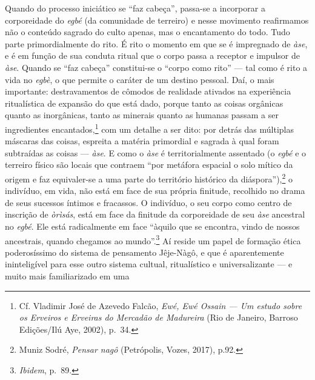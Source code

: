 Quando do processo iniciático se ``faz cabeça'', passa-se a incorporar a
corporeidade do \textit{egbé} (da comunidade de terreiro) e nesse
movimento reafirmamos não o conteúdo sagrado do culto apenas, mas o
encantamento do todo. Tudo parte primordialmente do rito. É rito o
momento em que se é impregnado de \textit{àse}, e é em função de sua
conduta ritual que o corpo passa a receptor e impulsor de \textit{àse}.
Quando se ``faz cabeça'' constitui-se o ``corpo como rito'' --- tal como
é rito a vida no \textit{egbè}, o que permite o caráter de um destino
pessoal. Daí, o mais importante: destravamentos de cômodos de realidade
ativados na experiência ritualística de expansão do que está dado,
porque tanto as coisas orgânicas quanto as inorgânicas, tanto as
minerais quanto as humanas passam a ser ingredientes
encantados,\footnote{Cf. Vladimir José de Azevedo Falcão, \textit{Ewé, Ewé
  Ossain --- Um estudo sobre os Erveiros e Erveiras do Mercadão de
  Madureira} (Rio de Janeiro, Barroso Edições/Ilú Aye, 2002), p.~34.}
com um detalhe a ser dito: por detrás das múltiplas máscaras das coisas,
espreita a matéria primordial e sagrada à qual foram subtraídas as
coisas --- \textit{àse}. E como o \textit{àse} é territorialmente assentado
(o \textit{egbé} e o terreiro físico são locais que contraem ``por
metáfora espacial o solo mítico da origem e faz equivaler-se a uma parte
do território histórico da diáspora''),\footnote{Muniz Sodré,
  \textit{Pensar nagô} (Petrópolis, Vozes, 2017), p.92.} o indivíduo, em
vida, não está em face de sua própria finitude, recolhido no drama de
seus sucessos íntimos e fracassos. O indivíduo, o seu corpo como centro
de inscrição de \textit{òrìsás}, está em face da finitude da corporeidade
de seu \textit{àse} ancestral no \textit{egbé}. Ele está radicalmente em
face ``àquilo que se encontra, vindo de nossos ancestrais, quando
chegamos ao mundo''.\footnote{\textit{Ibidem}, p.~89.} Aí reside um papel
de formação ética poderosíssimo do sistema de pensamento Jêje-Nàgô, e
que é aparentemente ininteligível para esse outro sistema cultual,
ritualístico e universalizante --- e muito mais familiarizado em uma
